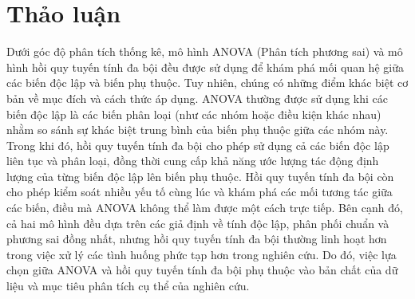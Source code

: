 \section{Thảo luận}
Dưới góc độ phân tích thống kê, mô hình ANOVA (Phân tích phương sai) và mô hình hồi quy tuyến tính đa bội đều được sử dụng để khám phá mối quan hệ giữa các biến độc lập và biến phụ thuộc. Tuy nhiên, chúng có những điểm khác biệt cơ bản về mục đích và cách thức áp dụng. ANOVA thường được sử dụng khi các biến độc lập là các biến phân loại (như các nhóm hoặc điều kiện khác nhau) nhằm so sánh sự khác biệt trung bình của biến phụ thuộc giữa các nhóm này. Trong khi đó, hồi quy tuyến tính đa bội cho phép sử dụng cả các biến độc lập liên tục và phân loại, đồng thời cung cấp khả năng ước lượng tác động định lượng của từng biến độc lập lên biến phụ thuộc. Hồi quy tuyến tính đa bội còn cho phép kiểm soát nhiều yếu tố cùng lúc và khám phá các mối tương tác giữa các biến, điều mà ANOVA không thể làm được một cách trực tiếp. Bên cạnh đó, cả hai mô hình đều dựa trên các giả định về tính độc lập, phân phối chuẩn và phương sai đồng nhất, nhưng hồi quy tuyến tính đa bội thường linh hoạt hơn trong việc xử lý các tình huống phức tạp hơn trong nghiên cứu. Do đó, việc lựa chọn giữa ANOVA và hồi quy tuyến tính đa bội phụ thuộc vào bản chất của dữ liệu và mục tiêu phân tích cụ thể của nghiên cứu.